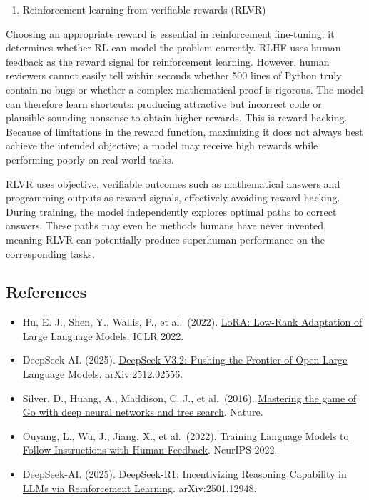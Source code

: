 \begin{enumerate}
\def\labelenumi{\arabic{enumi}.}
\setcounter{enumi}{3}
\tightlist
\item
  Reinforcement learning from verifiable rewards (RLVR)
\end{enumerate}

Choosing an appropriate reward is essential in reinforcement fine-tuning: it determines whether RL can model the problem correctly. RLHF uses human feedback as the reward signal for reinforcement learning. However, human reviewers cannot easily tell within seconds whether 500 lines of Python truly contain no bugs or whether a complex mathematical proof is rigorous. The model can therefore learn shortcuts: producing attractive but incorrect code or plausible-sounding nonsense to obtain higher rewards. This is reward hacking. Because of limitations in the reward function, maximizing it does not always best achieve the intended objective; a model may receive high rewards while performing poorly on real-world tasks.

RLVR uses objective, verifiable outcomes such as mathematical answers and programming outputs as reward signals, effectively avoiding reward hacking. During training, the model independently explores optimal paths to correct answers. These paths may even be methods humans have never invented, meaning RLVR can potentially produce superhuman performance on the corresponding tasks.

\FloatBarrier
{}
\hypertarget{references-76}{%
\subsection{References}\label{references-76}}

\vspace{0.25em}
\begin{itemize}
\tightlist
\item
  Hu, E. J., Shen, Y., Wallis, P., et al.~(2022). \href{https://arxiv.org/abs/2106.09685}{LoRA: Low-Rank Adaptation of Large Language Models}. ICLR 2022.
\item
  DeepSeek-AI. (2025). \href{https://arxiv.org/abs/2512.02556}{DeepSeek-V3.2: Pushing the Frontier of Open Large Language Models}. arXiv:2512.02556.
\item
  Silver, D., Huang, A., Maddison, C. J., et al.~(2016). \href{https://www.nature.com/articles/nature16961}{Mastering the game of Go with deep neural networks and tree search}. Nature.
\item
  Ouyang, L., Wu, J., Jiang, X., et al.~(2022). \href{https://arxiv.org/abs/2203.02155}{Training Language Models to Follow Instructions with Human Feedback}. NeurIPS 2022.
\item
  DeepSeek-AI. (2025). \href{https://arxiv.org/abs/2501.12948}{DeepSeek-R1: Incentivizing Reasoning Capability in LLMs via Reinforcement Learning}. arXiv:2501.12948.
\end{itemize}

\clearpage
